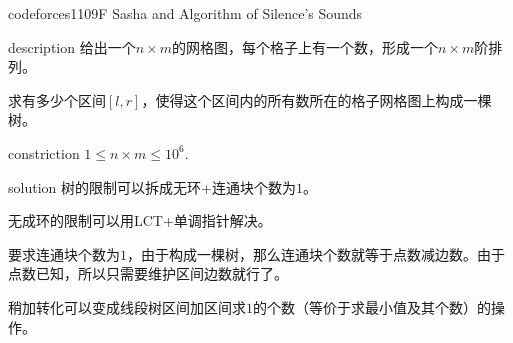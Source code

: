 \documentclass{beamer}
\begin{document}
	\begin{frame}{codeforces1109F Sasha and Algorithm of Silence's Sounds}
		\begin{block}{description}
			给出一个$n \times m$的网格图，每个格子上有一个数，形成一个$n\times m$阶排列。
			
			求有多少个区间$[l,r]$，使得这个区间内的所有数所在的格子网格图上构成一棵树。
		\end{block}
		\begin{block}{constriction}
			$1 \le n\times m \le 10^6.$
		\end{block}
		\pause
		\begin{block}{solution}
			树的限制可以拆成无环+连通块个数为$1$。
			
			无成环的限制可以用LCT+单调指针解决。
			
			要求连通块个数为$1$，由于构成一棵树，那么连通块个数就等于点数减边数。由于点数已知，所以只需要维护区间边数就行了。
			
			稍加转化可以变成线段树区间加区间求$1$的个数（等价于求最小值及其个数）的操作。
		\end{block}
	\end{frame}
\end{document}

